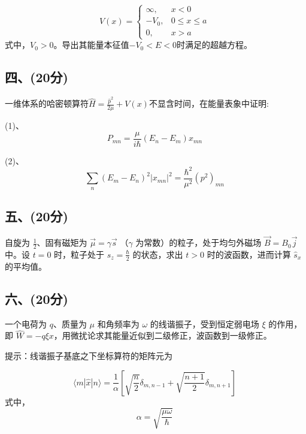 \[
V(x) = \begin{cases} 
\infty, & x < 0 \\
-V_0, & 0 \leq x \leq a \\
0, & x > a
\end{cases}~
\] 
式中，$V_0>0$。导出其能量本征值$-V_0<E<0$时满足的超越方程。
\subsection{四、(20分)}
一维体系的哈密顿算符$\hat{H}=\frac{\hat{p}^2}{2\mu}+V(x)$不显含时间，在能量表象中证明:

(1)、$$P_{mn}=\frac{\mu}{i\hbar}(E_n-E_m)x_{mn}~$$

(2)、$$\sum_n (E_m - E_n)^2 |x_{mn}|^2 = \frac{\hbar^2}{\mu^2} (p^2)_{mn}~$$
\subsection{五、(20分)}
自旋为 $\frac{1}{2}$、固有磁矩为 $\vec{\mu} = \gamma \vec{s}$ （$\gamma$ 为常数）的粒子，处于均匀外磁场 $\vec{B} = B_0 \vec{j}$ 中。设 $t = 0$ 时，粒子处于 $s_z = \frac{\hbar}{2}$ 的状态，求出 $t > 0$ 时的波函数，进而计算 $\hat{s}_x$ 的平均值。
\subsection{六、(20分)}
一个电荷为 $q$、质量为 $\mu$ 和角频率为 $\omega$ 的线谐振子，受到恒定弱电场 $\xi$ 的作用，即 $\hat{W} = -q \xi x$，用微扰论求其能量近似到二级修正，波函数到一级修正。

提示：线谐振子基底之下坐标算符的矩阵元为

$$\langle m | \hat{x} | n \rangle = \frac{1}{\alpha} \left[ \sqrt{\frac{n}{2}} \delta_{m, n-1} + \sqrt{\frac{n+1}{2}} \delta_{m, n+1} \right]~$$
式中，
$$\alpha = \sqrt{\frac{\mu \omega}{\hbar}}~$$